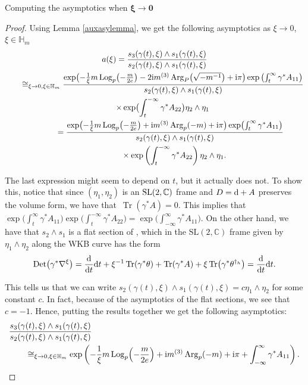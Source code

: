 \begin{subsubsection}{Computing the asymptotics when $\boldsymbol{\xi \to 0}$}
\begin{proof}
Using Lemma \ref{auxasylemma}, we get the following asymptotics as $\xi \to 0$, $\xi \in \mathbb{H}_m$
\begin{gather*}
 a(\xi)=\frac{s_3(\gamma(t),\xi)\wedge s_1(\gamma(t),\xi)}{s_2(\gamma(t),\xi)\wedge s_1(\gamma(t),\xi)}\\
 \hphantom{a(\xi)}
 \cong_{\xi \to 0, \xi \in \mathbb{H}_m}\frac{\exp \bigl(-\frac{1}{\xi}m\operatorname{Log}_p\bigl(-\frac{m}{2e}\bigr)-2{\rm i}m^{(3)}\operatorname{Arg}_P\bigl(\sqrt{-m^{-1}}\bigr)+{\rm i}\pi\bigr)\exp \left(\int_{t}^{\infty}\gamma^*A_{11}\right)}{s_2(\gamma(t),\xi)\wedge s_1(\gamma(t),\xi)}\\
 \qquad\times\exp \bigl(\int_{t}^{-\infty}\gamma^*A_{22}\bigr)\eta_2\wedge \eta_1\\
\qquad\qquad =\frac{\exp \bigl(-\frac{1}{\xi}m\operatorname{Log}_p\bigl(-\frac{m}{2e}\bigr)+{\rm i}m^{(3)}\operatorname{Arg}_p(-m)+{\rm i}\pi\bigr)\exp \bigl(\int_{t}^{\infty}\gamma^*A_{11}\bigr)}{s_2(\gamma(t),\xi)\wedge s_1(\gamma(t),\xi)}\\
 \qquad\qquad \phantom{=}{}\times\exp \left(\int_{t}^{-\infty}\gamma^*A_{22}\right)\eta_2\wedge \eta_1.
\end{gather*}

The last expression might seem to depend on $t$, but it actually does not. To show this, notice that since $(\eta_1,\eta_2)$ is an ${\rm SL}(2,\mathbb{C})$ frame and $D={\rm d}+A$ preserves the volume form, we have that~${\operatorname{Tr}(\gamma^*A)=0}$. This implies that $\exp \bigl(\int_{t}^{\infty}\gamma^*A_{11}\bigr)\exp \bigl(\int_{t}^{-\infty}\gamma^*A_{22}\bigr)=\exp \bigl(\int_{-\infty}^{\infty}\gamma^*A_{11}\bigr)$. On the other hand, we have that $s_2\wedge s_1$ is a flat section of , which in the $\mathrm{SL}(2,\mathbb{C})$ frame given by $\eta_1\wedge \eta_2$ along the WKB curve has the form
\begin{equation*}
\operatorname{Det}\bigl(\gamma^*\nabla^{\xi}\bigr)=\frac{{\rm d}}{{\rm d}t}{\rm d}t +\xi^{-1}\operatorname{Tr}(\gamma^* \theta)+\operatorname{Tr}(\gamma^* A) + \xi \operatorname{Tr}\bigl(\gamma^* \theta^{\dagger_h}\bigr) = \frac{{\rm d}}{{\rm d}t}{\rm d}t.
\end{equation*}

This tells us that we can write
$
s_2(\gamma(t),
\xi)\wedge s_1(\gamma(t),\xi)=c\eta_1\wedge \eta_2
$
for some constant $c$. In fact, because of the asymptotics of the flat sections, we see that $c=-1$. Hence, putting the results together we get the following asymptotics:
\begin{align*}
& \frac{s_3(\gamma(t),\xi)\wedge s_1(\gamma(t),\xi)}{s_2(\gamma(t),\xi)\wedge s_1(\gamma(t),\xi)}
\\
& \qquad{}\cong_{\xi \to 0, \xi \in \mathbb{H}_m} \exp \left(-\frac{1}{\xi}m\operatorname{Log}_p\Bigl(-\frac{m}{2e}\Bigr)+{\rm i}m^{(3)}\operatorname{Arg}_p(-m)+{\rm i}\pi
 +\int_{-\infty}^{\infty}\gamma^*A_{11}\right).
\end{align*}


\end{proof}
\end{subsubsection}
